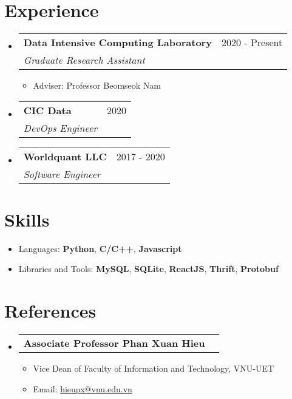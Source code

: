 \documentclass[a4paper,11pt]{article}
\makeatletter
\newcommand{\resumeItem}[1]{
  \item\small{
    {#1 \vspace{-2pt}}
  }
}
\newcommand{\resumeSubheadTwo}[2]{
  \vspace{-1pt}\item
    \begin{tabular*}{0.97\textwidth}{l@{\extracolsep{\fill}}r}
      \textbf{#1} & #2
    \end{tabular*}\vspace{-5pt}
}
\newcommand{\resumeSubhead}[3]{
  \vspace{-1pt}\item
    \begin{tabular*}{0.97\textwidth}{l@{\extracolsep{\fill}}r}
      \textbf{#1} & #2 \\
      \textit{\normalsize#3}
    \end{tabular*}\vspace{-5pt}
}
\newcommand{\resumeSubHeadingListStart}{\begin{itemize}[leftmargin=*]}
\newcommand{\resumeSubHeadingListEnd}{\end{itemize}}
\newcommand{\resumeItemListStart}{\begin{itemize}}
\newcommand{\resumeItemListEnd}{\end{itemize}\vspace{-5pt}}
\makeatother
\begin{document}
\section{Experience}
  \resumeSubHeadingListStart
    \resumeSubhead
      {Data Intensive Computing Laboratory}{2020 - Present}
      {Graduate Research Assistant}
      \resumeItemListStart
        \resumeItem{Adviser: Professor Beomseok Nam}
      \resumeItemListEnd
    \resumeSubhead
      {CIC Data}{2020}
      {DevOps Engineer}
    \resumeSubhead
      {Worldquant LLC}{2017 - 2020}
      {Software Engineer}
  \resumeSubHeadingListEnd

\section{Skills}
  \resumeItemListStart
    \resumeItem{Languages: \textbf{Python}, \textbf{C/C++}, \textbf{Javascript}}
    \resumeItem{Libraries and Tools: \textbf{MySQL}, \textbf{SQLite}, \textbf{ReactJS}, \textbf{Thrift}, \textbf{Protobuf}}
  \resumeItemListEnd

\section{References}
  \resumeSubHeadingListStart
    \resumeSubheadTwo
      {Associate Professor Phan Xuan Hieu}{}
      \resumeItemListStart
        \resumeItem{Vice Dean of Faculty of Information and Technology, VNU-UET}
        \resumeItem{Email: \href{mailto:hieupx@vnu.edu.vn}{hieupx@vnu.edu.vn}}
      \resumeItemListEnd
  \resumeSubHeadingListEnd
\end{document}
